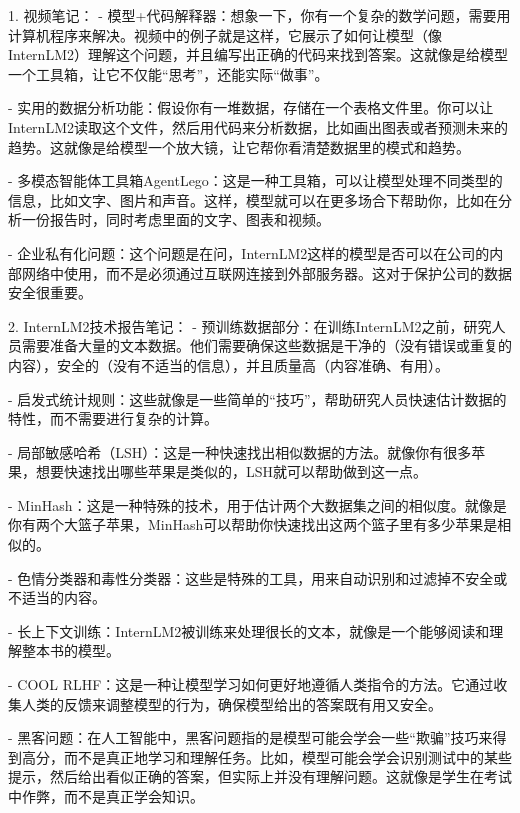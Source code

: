 1. 视频笔记：
- 模型+代码解释器：想象一下，你有一个复杂的数学问题，需要用计算机程序来解决。视频中的例子就是这样，它展示了如何让模型（像InternLM2）理解这个问题，并且编写出正确的代码来找到答案。这就像是给模型一个工具箱，让它不仅能“思考”，还能实际“做事”。

- 实用的数据分析功能：假设你有一堆数据，存储在一个表格文件里。你可以让InternLM2读取这个文件，然后用代码来分析数据，比如画出图表或者预测未来的趋势。这就像是给模型一个放大镜，让它帮你看清楚数据里的模式和趋势。

- 多模态智能体工具箱AgentLego：这是一种工具箱，可以让模型处理不同类型的信息，比如文字、图片和声音。这样，模型就可以在更多场合下帮助你，比如在分析一份报告时，同时考虑里面的文字、图表和视频。

- 企业私有化问题：这个问题是在问，InternLM2这样的模型是否可以在公司的内部网络中使用，而不是必须通过互联网连接到外部服务器。这对于保护公司的数据安全很重要。

2. InternLM2技术报告笔记：
- 预训练数据部分：在训练InternLM2之前，研究人员需要准备大量的文本数据。他们需要确保这些数据是干净的（没有错误或重复的内容），安全的（没有不适当的信息），并且质量高（内容准确、有用）。

- 启发式统计规则：这些就像是一些简单的“技巧”，帮助研究人员快速估计数据的特性，而不需要进行复杂的计算。

- 局部敏感哈希（LSH）：这是一种快速找出相似数据的方法。就像你有很多苹果，想要快速找出哪些苹果是类似的，LSH就可以帮助做到这一点。

- MinHash：这是一种特殊的技术，用于估计两个大数据集之间的相似度。就像是你有两个大篮子苹果，MinHash可以帮助你快速找出这两个篮子里有多少苹果是相似的。

- 色情分类器和毒性分类器：这些是特殊的工具，用来自动识别和过滤掉不安全或不适当的内容。

- 长上下文训练：InternLM2被训练来处理很长的文本，就像是一个能够阅读和理解整本书的模型。

- COOL RLHF：这是一种让模型学习如何更好地遵循人类指令的方法。它通过收集人类的反馈来调整模型的行为，确保模型给出的答案既有用又安全。

- 黑客问题：在人工智能中，黑客问题指的是模型可能会学会一些“欺骗”技巧来得到高分，而不是真正地学习和理解任务。比如，模型可能会学会识别测试中的某些提示，然后给出看似正确的答案，但实际上并没有理解问题。这就像是学生在考试中作弊，而不是真正学会知识。

